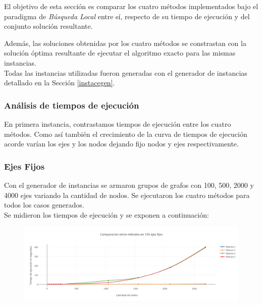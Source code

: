 El objetivo de esta secci\'on es comparar los cuatro m\'etodos implementados bajo el paradigma de \emph{B\'usqueda Local} entre s\'i, respecto de su tiempo de ejecuci\'on y del conjunto soluci\'on resultante.

Adem\'as, las soluciones obtenidas por los cuatro m\'etodos se constrastan con la soluci\'on \'optima resultante de ejecutar el algoritmo exacto para las mismas instancias.\\

Todas las instancias utilizadas fueron generadas con el generador de instancias detallado en la Secci\'on \ref{instacegen}.

\subsubsection{An\'alisis de tiempos de ejecuci\'on}\label{tiempos}

En primera instancia, contrastamos tiempos de ejecuci\'on entre los cuatro m\'etodos. Como as\'i tambi\'en el crecimiento de la curva de tiempos de ejecuci\'on acorde var\'ian los ejes y los nodos dejando fijo nodos y ejes respectivamente.

\subsubsection*{Ejes Fijos}

Con el generador de instancias se armaron grupos de grafos con 100, 500, 2000 y 4000 ejes variando la cantidad de nodos. Se ejecutaron los cuatro m\'etodos para todos los casos generados.\\

Se midieron los tiempos de ejecuci\'on y se exponen a continuaci\'on:

  \begin{figure}[h!]
   \begin{center}
 	\includegraphics[scale=0.55]{imagenes/local/tiempos/100ejes.png}
   \end{center}
 \end{figure}
 
